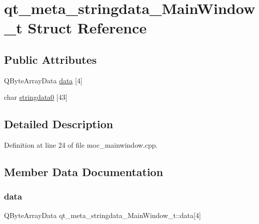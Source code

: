 \hypertarget{structqt__meta__stringdata___main_window__t}{}\section{qt\+\_\+meta\+\_\+stringdata\+\_\+\+Main\+Window\+\_\+t Struct Reference}
\label{structqt__meta__stringdata___main_window__t}
\subsection*{Public Attributes}
\begin{DoxyCompactItemize}
\item 
Q\+Byte\+Array\+Data \hyperlink{structqt__meta__stringdata___main_window__t_a332d7fa058028f7613b5ba68abb5a7fe}{data} \mbox{[}4\mbox{]}
\item 
char \hyperlink{structqt__meta__stringdata___main_window__t_af7bc4685461b0d13618119dbb90593d5}{stringdata0} \mbox{[}43\mbox{]}
\end{DoxyCompactItemize}


\subsection{Detailed Description}


Definition at line 24 of file moc\+\_\+mainwindow.\+cpp.



\subsection{Member Data Documentation}
\mbox{\label{structqt__meta__stringdata___main_window__t_a332d7fa058028f7613b5ba68abb5a7fe}} 
\subsubsection{\texorpdfstring{data}{data}}
{\footnotesize\ttfamily Q\+Byte\+Array\+Data qt\+\_\+meta\+\_\+stringdata\+\_\+\+Main\+Window\+\_\+t\+::data\mbox{[}4\mbox{]}}



